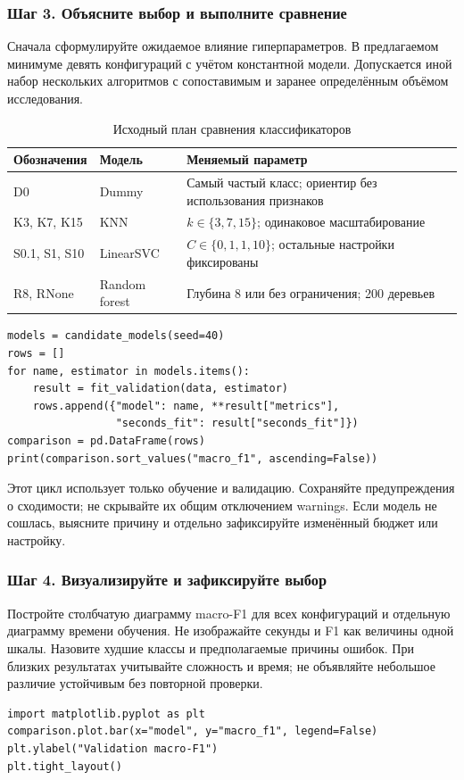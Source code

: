 \subsubsection*{Шаг 3. Объясните выбор и выполните сравнение}
Сначала сформулируйте ожидаемое влияние гиперпараметров. В предлагаемом минимуме девять конфигураций с учётом константной модели. Допускается иной набор нескольких алгоритмов с сопоставимым и заранее определённым объёмом исследования.
\begin{table}[H]\centering\small
\caption{Исходный план сравнения классификаторов}
\begin{tabularx}{\textwidth}{@{}l l Y@{}}
\toprule
Обозначения & Модель & Меняемый параметр \\
\midrule
D0 & Dummy & Самый частый класс; ориентир без использования признаков \\
K3, K7, K15 & KNN & \(k\in\{3,7,15\}\); одинаковое масштабирование \\
S0.1, S1, S10 & LinearSVC & \(C\in\{0{,}1,1,10\}\); остальные настройки фиксированы \\
R8, RNone & Random forest & Глубина 8 или без ограничения; 200 деревьев \\
\bottomrule
\end{tabularx}\end{table}
\begin{lstlisting}
models = candidate_models(seed=40)
rows = []
for name, estimator in models.items():
    result = fit_validation(data, estimator)
    rows.append({"model": name, **result["metrics"],
                 "seconds_fit": result["seconds_fit"]})
comparison = pd.DataFrame(rows)
print(comparison.sort_values("macro_f1", ascending=False))
\end{lstlisting}

Этот цикл использует только обучение и валидацию. Сохраняйте предупреждения о сходимости; не скрывайте их общим отключением warnings. Если модель не сошлась, выясните причину и отдельно зафиксируйте изменённый бюджет или настройку.

\subsubsection*{Шаг 4. Визуализируйте и зафиксируйте выбор}
Постройте столбчатую диаграмму macro-F1 для всех конфигураций и отдельную диаграмму времени обучения. Не изображайте секунды и F1 как величины одной шкалы. Назовите худшие классы и предполагаемые причины ошибок. При близких результатах учитывайте сложность и время; не объявляйте небольшое различие устойчивым без повторной проверки.
\begin{lstlisting}
import matplotlib.pyplot as plt
comparison.plot.bar(x="model", y="macro_f1", legend=False)
plt.ylabel("Validation macro-F1")
plt.tight_layout()
\end{lstlisting}

